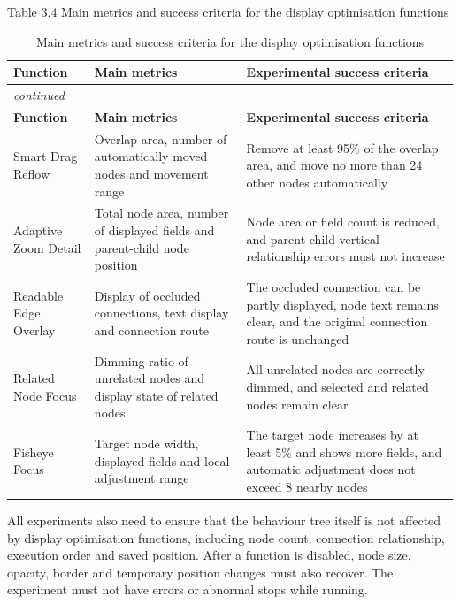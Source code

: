 \documentclass[11pt,a4paper,oneside,extrafontsizes]{memoir}
\begin{document}
Table 3.4 Main metrics and success criteria for the display optimisation functions

\begin{center}

\begin{longtable}{@{}p{} p{} p{}@{}}
\caption{Main metrics and success criteria for the display optimisation functions}\label{tab:display-metrics-criteria}\\
\toprule
\textbf{Function} & \textbf{Main metrics} & \textbf{Experimental success criteria} \\
\midrule
\endfirsthead
\multicolumn{3}{l}{\itshape continued}\\
\toprule
\textbf{Function} & \textbf{Main metrics} & \textbf{Experimental success criteria} \\
\midrule
\endhead
Smart Drag Reflow & Overlap area, number of automatically moved nodes and movement range & Remove at least 95\% of the overlap area, and move no more than 24 other nodes automatically \\
Adaptive Zoom Detail & Total node area, number of displayed fields and parent-child node position & Node area or field count is reduced, and parent-child vertical relationship errors must not increase \\
Readable Edge Overlay & Display of occluded connections, text display and connection route & The occluded connection can be partly displayed, node text remains clear, and the original connection route is unchanged \\
Related Node Focus & Dimming ratio of unrelated nodes and display state of related nodes & All unrelated nodes are correctly dimmed, and selected and related nodes remain clear \\
Fisheye Focus & Target node width, displayed fields and local adjustment range & The target node increases by at least 5\% and shows more fields, and automatic adjustment does not exceed 8 nearby nodes \\
\bottomrule
\end{longtable}
\end{center}

All experiments also need to ensure that the behaviour tree itself is not affected by display optimisation functions, including node count, connection relationship, execution order and saved position. After a function is disabled, node size, opacity, border and temporary position changes must also recover. The experiment must not have errors or abnormal stops while running.
\end{document}
